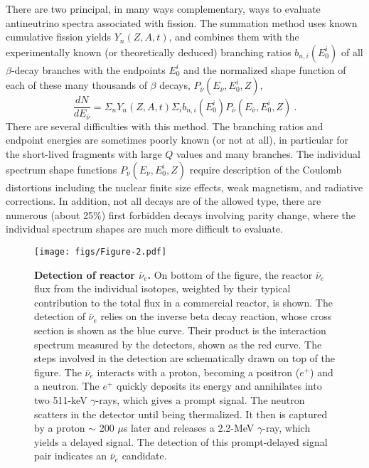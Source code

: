 \documentclass[aps,twocolumn,preprintnumbers,amsmath,superscriptaddress,amssymb,floats,nofootinbib]{revtex4-1}
\begin{document}
There are two principal, in many ways complementary, ways to evaluate antineutrino spectra associated with fission. 
 The summation method uses known cumulative fission yields $Y_n (Z,A,t)$, and combines them
 with the experimentally known (or theoretically deduced) branching ratios $b_{n,i}(E^i_0)$ of all $\beta$-decay branches with the endpoints $E^i_0$ and the
 normalized shape function of each of these many thousands of $\beta$ decays, $P_{\bar{\nu}} (E_{\bar{\nu}},E^i_0,Z)$,
 \begin{equation}
 \frac{dN}{dE_{\bar{\nu}}} = \Sigma_n Y_n (Z,A,t) \Sigma_i b_{n,i}(E^i_0) P_{\bar{\nu}} (E_{\bar{\nu}},E^i_0,Z) ~.
 \end{equation}
 There are several difficulties with this method. The branching ratios and endpoint energies are sometimes poorly known (or not at all), in particular for
 the short-lived fragments with large $Q$ values and many branches. The individual spectrum shape functions $P_{\bar{\nu}} (E_{\bar{\nu}},E^i_0,Z)$
 require description of the Coulomb distortions including the nuclear finite size effects, weak magnetism, and radiative corrections. In addition, not all
 decays are of the allowed type, there are numerous (about 25\%) first forbidden decays involving parity change, where the individual spectrum 
 shapes are much more difficult to evaluate. 
 
 \begin{figure}[tb]
 \begin{centering}
 \texttt{[image: figs/Figure-2.pdf]}
 \par\end{centering}
 \caption{\label{fig:spectra} {\bf Detection of reactor $\bar{\nu}_e$.} On bottom of the figure, the reactor $\bar{\nu}_e$ flux from the individual isotopes, weighted by their typical contribution to the total flux in a commercial reactor, is shown. The detection of $\bar{\nu}_e$ relies on the inverse beta decay reaction, whose cross section is shown as the blue curve. Their product is the interaction spectrum measured by the detectors, shown as the red curve. 
 The steps involved in the detection are schematically drawn on top of the figure. The $\bar{\nu}_e$ interacts with a proton, becoming a positron ($e^+$) and a neutron. The $e^+$ quickly deposits its energy and annihilates into two 511-keV $\gamma$-rays, which gives a prompt signal. The neutron scatters in the detector until being thermalized. It then is captured by a proton $\sim$ 200 $\mu$s later and releases a 2.2-MeV $\gamma$-ray, which yields a delayed signal. The detection of this prompt-delayed signal pair indicates an $\bar{\nu}_e$ candidate.}
 \end{figure}
 
\end{document}
